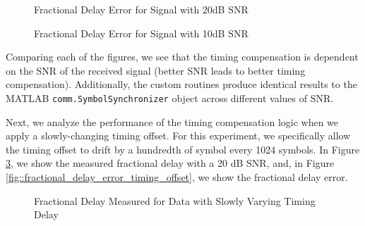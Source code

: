\documentclass{article}
\begin{document}
\begin{figure}[H]
	\centerline{}
	\caption{Fractional Delay Error for Signal with 20dB SNR}
	\label{fig::delay_error_20dB_snr}
\end{figure}

\begin{figure}[H]
	\centerline{}
	\caption{Fractional Delay Error for Signal with 10dB SNR}
	\label{fig::delay_error_10dB_snr}
\end{figure}

\noindent Comparing each of the figures, we see that the timing compensation is dependent on the SNR of the received signal (better SNR leads to better timing compensation). Additionally, the custom routines produce identical results to the MATLAB \texttt{comm.SymbolSynchronizer} object across different values of SNR.

Next, we analyze the performance of the timing compensation logic when we apply a slowly-changing timing offset. For this experiment, we specifically allow the timing offset to drift by a hundredth of symbol every 1024 symbols. In Figure \ref{fig::fractional_delay_timing_offset}, we show the measured fractional delay with a 20 dB SNR, and, in Figure \ref{fig::fractional_delay_error_timing_offset}, we show the fractional delay error.

\begin{figure}[H]
	\centerline{}
	\caption{Fractional Delay Measured for Data with Slowly Varying Timing Delay}
	\label{fig::fractional_delay_timing_offset}
\end{figure}
\end{document}
